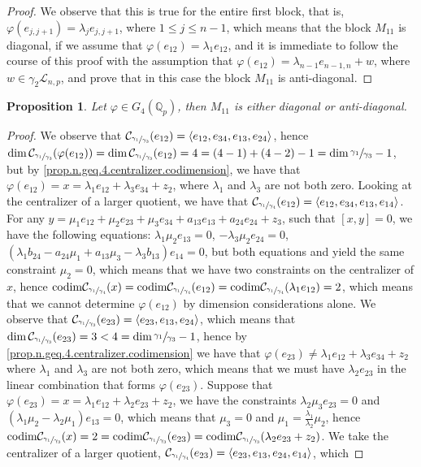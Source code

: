\documentclass[12pt]{article}
\newcommand*\circled[1]{\tikz[baseline=(char.base)]{
            \small \node[shape=circle,draw,inner sep=1pt] (char) {#1};}}
\newtheorem{proposition}[theorem]{Proposition}
\begin{document}
\begin{proof}
We observe that this is true for the entire first block, that is, $\varphi(e_{j,j+1})=\lambda_j e_{j,j+1}$, where $1\leq j\leq n-1$, which means that the block $M_{11}$ is diagonal, if we assume that $\varphi(e_{12})=\lambda_1 e_{12}$, and it is immediate to follow the course of this proof with the assumption that $\varphi(e_{12})=\lambda_{n-1}e_{n-1,n}+w$, where $w\in\gamma_2\mathcal{L}_{n,p}$, and prove that in this case the block $M_{11}$ is anti-diagonal.
\end{proof}
\begin{proposition}
\label{m11.n.4}
Let $\varphi\in G_4(\mathbb{Q}_p)$, then $M_{11}$ is either diagonal or anti-diagonal.
\end{proposition}
\begin{proof}
We observe that $\mathcal{C}_{\sfrac{\gamma_1}{\gamma_3}}(e_{12})=\langle e_{12},e_{34},e_{13},e_{24}\rangle$, hence $\dim\mathcal{C}_{\sfrac{\gamma_1}{\gamma_3}}(\varphi(e_{12}))=\dim\mathcal{C}_{\sfrac{\gamma_1}{\gamma_3}}(e_{12})=4=(4-1)+(4-2)-1=\dim\sfrac{\gamma_1}{\gamma_3}-1$, but by \ref{prop.n.geq.4.centralizer.codimension}, we have that $\varphi(e_{12})=x=\lambda_1 e_{12}+\lambda_3 e_{34}+z_2$, where $\lambda_1$ and $\lambda_3$ are not both zero. Looking at the centralizer of a larger quotient, we have that $\mathcal{C}_{\sfrac{\gamma_1}{\gamma_4}}(e_{12})=\langle e_{12},e_{34},e_{13},e_{14}\rangle$. For any $y=\mu_1 e_{12}+\mu_2 e_{23}+\mu_3 e_{34}+a_{13}e_{13}+a_{24}e_{24}+z_3$, such that $[x,y]=0$, we have the following equations: \circled{1} $\lambda_1\mu_2 e_{13}=0$, \circled{2} $-\lambda_3\mu_2 e_{24}=0$, \circled{3} $(\lambda_1 b_{24}-a_{24}\mu_1+a_{13}\mu_3-\lambda_3 b_{13})e_{14}=0$, but both equations \circled{1} and \circled{2} yield the same constraint $\mu_2=0$, which means that we have two constraints on the centralizer of $x$, hence $\mathrm{codim}\mathcal{C}_{\sfrac{\gamma_1}{\gamma_4}}(x)=\mathrm{codim}\mathcal{C}_{\sfrac{\gamma_1}{\gamma_4}}(e_{12})=\mathrm{codim}\mathcal{C}_{\sfrac{\gamma_1}{\gamma_4}}(\lambda_1 e_{12})=2$, which means that we cannot determine $\varphi(e_{12})$ by dimension considerations alone. We observe that $\mathcal{C}_{\sfrac{\gamma_1}{\gamma_3}}(e_{23})=\langle e_{23},e_{13},e_{24}\rangle$, which means that $\dim\mathcal{C}_{\sfrac{\gamma_1}{\gamma_3}}(e_{23})=3<4=\dim\sfrac{\gamma_1}{\gamma_3}-1$, hence by \ref{prop.n.geq.4.centralizer.codimension} we have that $\varphi(e_{23})\neq\lambda_1 e_{12}+\lambda_3 e_{34}+z_2$ where $\lambda_1$ and $\lambda_3$ are not both zero, which means that we must have $\lambda_2 e_{23}$ in the linear combination that forms $\varphi(e_{23})$. Suppose that $\varphi(e_{23})=x=\lambda_1 e_{12}+\lambda_2 e_{23}+z_2$, we have the constraints \circled{1} $\lambda_2\mu_3 e_{23}=0$ and \circled{2} $(\lambda_1\mu_2-\lambda_2\mu_1)e_{13}=0$, which means that $\mu_3=0$ and $\mu_1=\frac{\lambda_1}{\lambda_2}\mu_2$, hence $\mathrm{codim}\mathcal{C}_{\sfrac{\gamma_1}{\gamma_3}}(x)=2=\mathrm{codim}\mathcal{C}_{\sfrac{\gamma_1}{\gamma_3}}(e_{23})=\mathrm{codim}\mathcal{C}_{\sfrac{\gamma_1}{\gamma_3}}(\lambda_2 e_{23}+z_2)$. We take the centralizer of a larger quotient, $\mathcal{C}_{\sfrac{\gamma_1}{\gamma_4}}(e_{23})=\langle e_{23},e_{13},e_{24},e_{14}\rangle$, which 
\end{proof}
\end{document}
